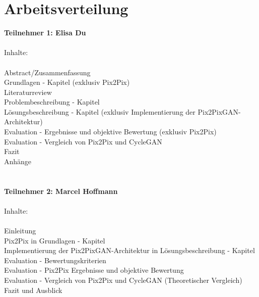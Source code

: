 \chapter*{Arbeitsverteilung}

\textbf{Teilnehmer 1:  Elisa Du} \\
\\
 Inhalte: \\
\\ Abstract/Zusammenfassung
\\ Grundlagen - Kapitel (exklusiv Pix2Pix)
\\ Literaturreview
\\ Problembeschreibung - Kapitel
\\ Lösungsbeschreibung - Kapitel (exklusiv Implementierung der Pix2PixGAN-Architektur)
\\ Evaluation - Ergebnisse und objektive Bewertung  (exklusiv Pix2Pix)
\\ Evaluation - Vergleich von Pix2Pix und CycleGAN
\\ Fazit
\\ Anhänge
\\ 
\\
\\
\textbf{Teilnehmer 2: Marcel Hoffmann} \\
\\
 Inhalte: \\
\\ Einleitung
\\ Pix2Pix in Grundlagen - Kapitel
\\ Implementierung der Pix2PixGAN-Architektur in Lösungsbeschreibung - Kapitel
\\ Evaluation - Bewertungskriterien
\\ Evaluation - Pix2Pix Ergebnisse und objektive Bewertung
\\ Evaluation - Vergleich von Pix2Pix und CycleGAN (Theoretischer Vergleich)
\\ Fazit und Ausblick
\\
\\
\\
